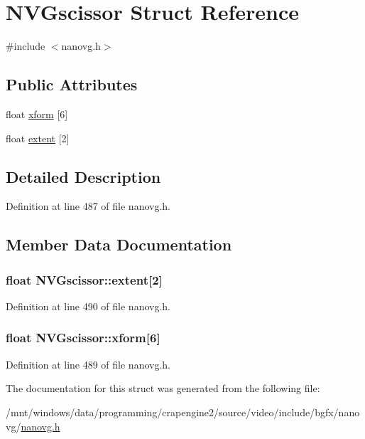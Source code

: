 \hypertarget{struct_n_v_gscissor}{\section{N\+V\+Gscissor Struct Reference}
\label{struct_n_v_gscissor}
}


{\ttfamily \#include $<$nanovg.\+h$>$}

\subsection*{Public Attributes}
\begin{DoxyCompactItemize}
\item 
float \hyperlink{struct_n_v_gscissor_a4ada1cb908081972303b3c793064e15a}{xform} \mbox{[}6\mbox{]}
\item 
float \hyperlink{struct_n_v_gscissor_a6188121936c43f1c32cfca66ab1234a2}{extent} \mbox{[}2\mbox{]}
\end{DoxyCompactItemize}


\subsection{Detailed Description}


Definition at line 487 of file nanovg.\+h.



\subsection{Member Data Documentation}
\hypertarget{struct_n_v_gscissor_a6188121936c43f1c32cfca66ab1234a2}{
\subsubsection[{extent}]{\setlength{\rightskip}{0pt plus 5cm}float N\+V\+Gscissor\+::extent\mbox{[}2\mbox{]}}}\label{struct_n_v_gscissor_a6188121936c43f1c32cfca66ab1234a2}


Definition at line 490 of file nanovg.\+h.

\hypertarget{struct_n_v_gscissor_a4ada1cb908081972303b3c793064e15a}{
\subsubsection[{xform}]{\setlength{\rightskip}{0pt plus 5cm}float N\+V\+Gscissor\+::xform\mbox{[}6\mbox{]}}}\label{struct_n_v_gscissor_a4ada1cb908081972303b3c793064e15a}


Definition at line 489 of file nanovg.\+h.



The documentation for this struct was generated from the following file\+:\begin{DoxyCompactItemize}
\item 
/mnt/windows/data/programming/crapengine2/source/video/include/bgfx/nanovg/\hyperlink{nanovg_8h}{nanovg.\+h}\end{DoxyCompactItemize}
